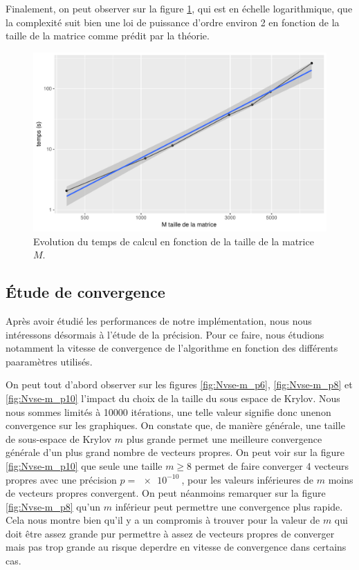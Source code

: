 \documentclass[11pt,a4paper]{article}
\begin{document}
		Finalement, on peut observer sur la figure \ref{fig:tvsM}, qui est en échelle logarithmique, que la complexité suit bien une loi de puissance d'ordre environ 2 en fonction de la taille de la matrice comme prédit par la théorie.
		\begin{figure}
			\centering
			\includegraphics[width = 0.7\linewidth]{plots/tvsM.pdf}
			\caption{Evolution du temps de calcul en fonction de la taille de la matrice $M$. \label{fig:tvsM}}
		\end{figure}


	\subsection{\'Etude de convergence}
		Après avoir étudié les performances de notre implémentation, nous nous intéressons désormais à l'étude de la précision. Pour ce faire, nous étudions notamment la vitesse de convergence de l'algorithme en fonction des différents paaramètres utilisés.

		On peut tout d'abord observer sur les figures \ref{fig:Nvse-m_p6}, \ref{fig:Nvse-m_p8} et \ref{fig:Nvse-m_p10} l'impact du choix de la taille du sous espace de Krylov. Nous nous sommes limités à 10000 itérations, une telle valeur signifie donc unenon convergence sur les graphiques. On constate que, de manière générale, une taille de sous-espace de Krylov $m$ plus grande permet une meilleure convergence générale d'un plus grand nombre de vecteurs propres. On peut voir sur la figure \ref{fig:Nvse-m_p10} que seule une taille $m \geq 8$ permet de faire converger 4 vecteurs propres avec une précision $p=\SI{e-10}{}$, pour les valeurs inférieures de $m$ moins de vecteurs propres convergent. On peut néanmoins remarquer sur la figure \ref{fig:Nvse-m_p8} qu'un $m$ inférieur peut permettre une convergence plus rapide. Cela nous montre bien qu'il y a un compromis à trouver pour la valeur de $m$ qui doit être assez grande pur permettre à assez de vecteurs propres de converger mais pas trop grande au risque deperdre en vitesse de convergence dans certains cas.
\end{document}
